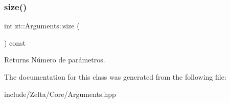 \subsubsection{\texorpdfstring{size()}{size()}}
{\footnotesize\ttfamily int zt\+::\+Arguments\+::size (\begin{DoxyParamCaption}{ }\end{DoxyParamCaption}) const}

\begin{DoxyReturn}{Returns}
Número de parámetros. 
\end{DoxyReturn}


The documentation for this class was generated from the following file\+:\begin{DoxyCompactItemize}
\item 
include/\+Zelta/\+Core/Arguments.\+hpp\end{DoxyCompactItemize}
